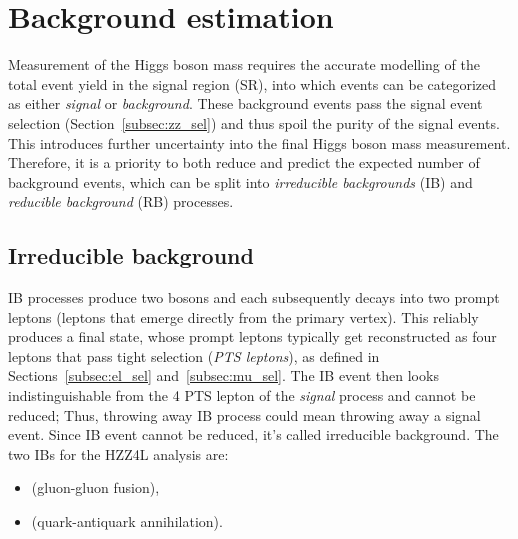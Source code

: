 \section{Background estimation}
\label{sec:bkg_estim}
Measurement of the Higgs boson mass requires the accurate modelling of the total event yield in the signal region (SR), into which events can be categorized as either \emph{signal} or \emph{background}.
These background events pass the signal event selection (Section~\ref{subsec:zz_sel}) and thus spoil the purity of the signal events.
This introduces further uncertainty into the final Higgs boson mass measurement.
Therefore, it is a priority to both reduce and predict the expected number of background events, which can be split into \emph{irreducible backgrounds} (IB) and \emph{reducible background} (RB) processes.

\subsection{Irreducible background}
\label{sec:bkg_irred}
IB processes produce two \PZ bosons and each \PZ subsequently decays into two prompt leptons (leptons that emerge directly from the primary vertex).
This reliably produces a \fourl final state, whose prompt leptons typically get reconstructed as four leptons that pass tight selection (\emph{PTS leptons}), as defined in Sections~\ref{subsec:el_sel} and~\ref{subsec:mu_sel}.
The IB event then looks indistinguishable from the 4 PTS lepton of the \emph{signal} process and cannot be reduced;
Thus, throwing away IB process could mean throwing away a signal event.
Since IB event cannot be reduced, it's called irreducible background.
The two IBs for the HZZ4L analysis are:
\begin{itemize}
    \item \ggZZfourl (gluon-gluon fusion),
    \item \qqggZZfourl (quark-antiquark annihilation).
\end{itemize}

